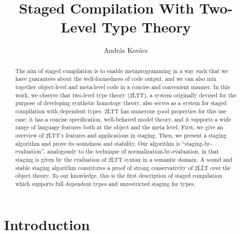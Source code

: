 \documentclass[acmsmall,anonymous,review]{acmart}
\theoremstyle{remark}
\begin{document}
\title{Staged Compilation With Two-Level Type Theory}

\author{András Kovács}

\begin{abstract}
  The aim of staged compilation is to enable metaprogramming in a way such that
  we have guarantees about the well-formedness of code output, and we can also
  mix together object-level and meta-level code in a concise and convenient
  manner. In this work, we observe that two-level type theory (2LTT), a system
  originally devised for the purpose of developing synthetic homotopy theory,
  also serves as a system for staged compilation with dependent types. 2LTT has
  numerous good properties for this use case: it has a concise specification,
  well-behaved model theory, and it supports a wide range of language features
  both at the object and the meta level. First, we give an overview of 2LTT's
  features and applications in staging. Then, we present a staging algorithm and
  prove its soundness and stability. Our algorithm is ``staging-by-evaluation'',
  analogously to the technique of normalization-by-evaluation, in that staging
  is given by the evaluation of 2LTT syntax in a semantic domain. A sound and
  stable staging algorithm constitutes a proof of strong conservativity of 2LLT
  over the object theory. To our knowledge, this is the first description of
  staged compilation which supports full dependent types and unrestricted
  staging for types.
\end{abstract}

\begin{CCSXML}
\end{CCSXML}

\maketitle

\section{Introduction}\label{sec:introduction}
\end{document}

